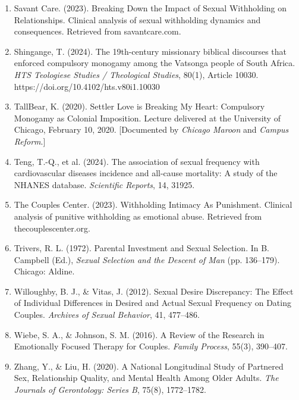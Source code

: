 \documentclass[12pt, letterpaper]{article}
\begin{document}
\begin{enumerate}
    \item Savant Care. (2023). Breaking Down the Impact of Sexual Withholding on Relationships. Clinical analysis of sexual withholding dynamics and consequences. Retrieved from savantcare.com.
    
    \item Shingange, T. (2024). The 19th-century missionary biblical discourses that enforced compulsory monogamy among the Vatsonga people of South Africa. \textit{HTS Teologiese Studies / Theological Studies}, 80(1), Article 10030. https://doi.org/10.4102/hts.v80i1.10030
    
    \item TallBear, K. (2020). Settler Love is Breaking My Heart: Compulsory Monogamy as Colonial Imposition. Lecture delivered at the University of Chicago, February 10, 2020. [Documented by \textit{Chicago Maroon} and \textit{Campus Reform}.]
    
    \item Teng, T.-Q., et al. (2024). The association of sexual frequency with cardiovascular diseases incidence and all-cause mortality: A study of the NHANES database. \textit{Scientific Reports}, 14, 31925.
    
    \item The Couples Center. (2023). Withholding Intimacy As Punishment. Clinical analysis of punitive withholding as emotional abuse. Retrieved from thecouplescenter.org.
    
    \item Trivers, R. L. (1972). Parental Investment and Sexual Selection. In B. Campbell (Ed.), \textit{Sexual Selection and the Descent of Man} (pp. 136--179). Chicago: Aldine.
    
    \item Willoughby, B. J., \& Vitas, J. (2012). Sexual Desire Discrepancy: The Effect of Individual Differences in Desired and Actual Sexual Frequency on Dating Couples. \textit{Archives of Sexual Behavior}, 41, 477--486.
    
    \item Wiebe, S. A., \& Johnson, S. M. (2016). A Review of the Research in Emotionally Focused Therapy for Couples. \textit{Family Process}, 55(3), 390--407.
    
    \item Zhang, Y., \& Liu, H. (2020). A National Longitudinal Study of Partnered Sex, Relationship Quality, and Mental Health Among Older Adults. \textit{The Journals of Gerontology: Series B}, 75(8), 1772--1782.
\end{enumerate}
\end{document}
